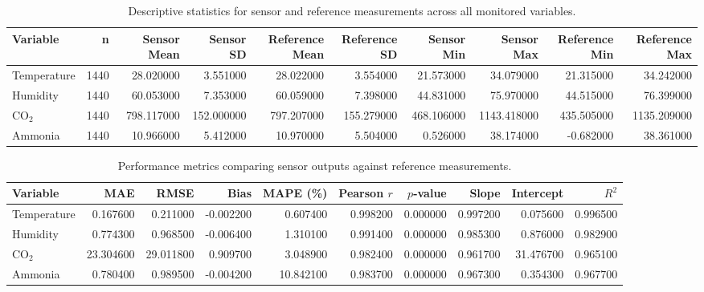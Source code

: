 \begin{table}
\caption{Descriptive statistics for sensor and reference measurements across all monitored variables.}
\label{tab:descriptive_stats}
\begin{tabular}{lrrrrrrrrr}
\toprule
Variable & n & Sensor Mean & Sensor SD & Reference Mean & Reference SD & Sensor Min & Sensor Max & Reference Min & Reference Max \\
\midrule
Temperature & 1440 & 28.020000 & 3.551000 & 28.022000 & 3.554000 & 21.573000 & 34.079000 & 21.315000 & 34.242000 \\
Humidity & 1440 & 60.053000 & 7.353000 & 60.059000 & 7.398000 & 44.831000 & 75.970000 & 44.515000 & 76.399000 \\
CO$_2$ & 1440 & 798.117000 & 152.000000 & 797.207000 & 155.279000 & 468.106000 & 1143.418000 & 435.505000 & 1135.209000 \\
Ammonia & 1440 & 10.966000 & 5.412000 & 10.970000 & 5.504000 & 0.526000 & 38.174000 & -0.682000 & 38.361000 \\
\bottomrule
\end{tabular}
\end{table}


\begin{table}
\caption{Performance metrics comparing sensor outputs against reference measurements.}
\label{tab:performance_metrics}
\begin{tabular}{lrrrrrrrrr}
\toprule
Variable & MAE & RMSE & Bias & MAPE (\%) & Pearson $r$ & $p$-value & Slope & Intercept & $R^2$ \\
\midrule
Temperature & 0.167600 & 0.211000 & -0.002200 & 0.607400 & 0.998200 & 0.000000 & 0.997200 & 0.075600 & 0.996500 \\
Humidity & 0.774300 & 0.968500 & -0.006400 & 1.310100 & 0.991400 & 0.000000 & 0.985300 & 0.876000 & 0.982900 \\
CO$_2$ & 23.304600 & 29.011800 & 0.909700 & 3.048900 & 0.982400 & 0.000000 & 0.961700 & 31.476700 & 0.965100 \\
Ammonia & 0.780400 & 0.989500 & -0.004200 & 10.842100 & 0.983700 & 0.000000 & 0.967300 & 0.354300 & 0.967700 \\
\bottomrule
\end{tabular}
\end{table}


